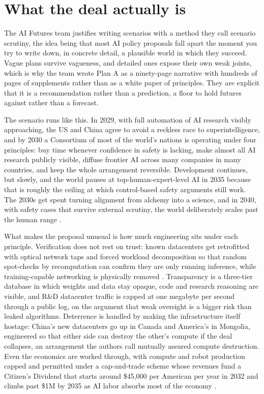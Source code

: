 \documentclass[11pt,letterpaper]{article}
\begin{document}
\section{What the deal actually is}

The AI Futures team justifies writing scenarios with a method they call scenario scrutiny, the idea being that most AI policy proposals fall apart the moment you try to write down, in concrete detail, a plausible world in which they succeed. Vague plans survive vagueness, and detailed ones expose their own weak joints, which is why the team wrote Plan A as a ninety-page narrative with hundreds of pages of supplements rather than as a white paper of principles. They are explicit that it is a recommendation rather than a prediction, a floor to hold futures against rather than a forecast.

The scenario runs like this. In 2029, with full automation of AI research visibly approaching, the US and China agree to avoid a reckless race to superintelligence, and by 2030 a Consortium of most of the world's nations is operating under four principles: buy time whenever confidence in safety is lacking, make almost all AI research publicly visible, diffuse frontier AI across many companies in many countries, and keep the whole arrangement reversible. Development continues, but slowly, and the world pauses at top-human-expert-level AI in 2035 because that is roughly the ceiling at which control-based safety arguments still work. The 2030s get spent turning alignment from alchemy into a science, and in 2040, with safety cases that survive external scrutiny, the world deliberately scales past the human range \citep{ai2040}.

What makes the proposal unusual is how much engineering sits under each principle. Verification does not rest on trust: known datacenters get retrofitted with optical network taps and forced workload decomposition so that random spot-checks by recomputation can confirm they are only running inference, while training-capable networking is physically removed \citep{supplements}. Transparency is a three-tier database in which weights and data stay opaque, code and research reasoning are visible, and R\&D datacenter traffic is capped at one megabyte per second through a public log, on the argument that weak oversight is a bigger risk than leaked algorithms. Deterrence is handled by making the infrastructure itself hostage: China's new datacenters go up in Canada and America's in Mongolia, engineered so that either side can destroy the other's compute if the deal collapses, an arrangement the authors call mutually assured compute destruction. Even the economics are worked through, with compute and robot production capped and permitted under a cap-and-trade scheme whose revenues fund a Citizen's Dividend that starts around \$45{,}000 per American per year in 2032 and climbs past \$1M by 2035 as AI labor absorbs most of the economy \citep{supplements}.
\end{document}
